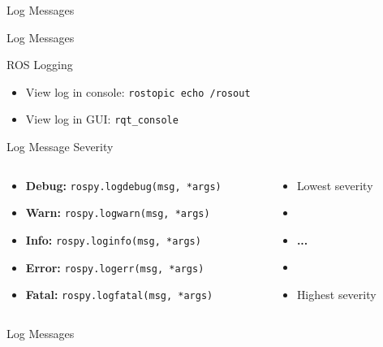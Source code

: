 \documentclass[9pt]{beamer}
\begin{document}
\begin{section}{Log Messages}
    \begin{frame}{Log Messages}
        \begin{block}{ROS Logging}
        \begin{itemize}
            \item[] View log in console: \lstinline{rostopic echo /rosout}
            \item[] View log in GUI: \lstinline{rqt_console}
        \end{itemize}
        \end{block}
        \begin{block}{Log Message Severity}
            \begin{columns}
                \begin{column}{0.7\textwidth}
                    \begin{itemize}
                        \item[] \textbf{Debug:} \lstinline{rospy.logdebug(msg, *args)}
                        \item[] \textbf{Warn:} \lstinline{rospy.logwarn(msg, *args)}
                        \item[] \textbf{Info:} \lstinline{rospy.loginfo(msg, *args)}
                        \item[] \textbf{Error:} \lstinline{rospy.logerr(msg, *args)}
                        \item[] \textbf{Fatal:} \lstinline{rospy.logfatal(msg, *args)}
                    \end{itemize}
                \end{column}
                \begin{column}{0.3\textwidth}
                    \begin{itemize}
                    \item[] Lowest severity
                    \item[] \hfill 
                    \item[] \textbf{...}
                    \item[] \hfill 
                    \item[] Highest severity
                    \end{itemize}
                \end{column}
            \end{columns}
        \end{block}
    \end{frame}
    \begin{frame}[fragile]{Log Messages}

\end{frame}
\end{section}
\end{document}
